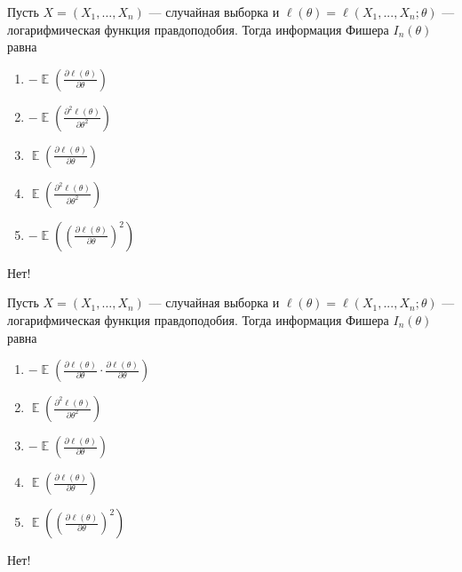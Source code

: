 \documentclass[t]{beamer}
\DeclareMathOperator{\E}{\mathbb{E}}
\begin{document}
 \begin{frame} \label{50-No} 
\begin{block}{50} 

Пусть $X = (X_1, \ldots , X_n)$ — случайная выборка и $\ell(\theta) = \ell(X_1, ... , X_n; \theta)$ — логарифмическая функция правдоподобия. Тогда информация Фишера $I_n(\theta)$ равна
  


 \end{block} 
\begin{enumerate} 
\item[] \hyperlink{50-No}{\beamergotobutton{} $-\E \left( \frac{\partial \ell (\theta)}{\partial \theta} \right)$}
\item[] \hyperlink{50-Yes}{\beamergotobutton{} $-\E \left( \frac{\partial^2 \ell (\theta)}{\partial \theta^2} \right)$}
\item[] \hyperlink{50-No}{\beamergotobutton{} $\E \left( \frac{\partial \ell (\theta)}{\partial \theta} \right)$}
\item[] \hyperlink{50-No}{\beamergotobutton{} $\E \left( \frac{\partial^2 \ell (\theta)}{\partial \theta^2} \right)$}
\item[] \hyperlink{50-No}{\beamergotobutton{} $-\E \left( \left( \frac{\partial \ell (\theta)}{\partial \theta} \right) ^2 \right)$}
\end{enumerate} 

 \alert{Нет!} 
\end{frame} 


 \begin{frame} \label{51-No} 
\begin{block}{51} 

Пусть $X = (X_1, \ldots , X_n)$ — случайная выборка и $\ell(\theta) = \ell(X_1, ... , X_n; \theta)$ — логарифмическая функция правдоподобия. Тогда информация Фишера $I_n(\theta)$ равна
  


 \end{block} 
\begin{enumerate} 
\item[] \hyperlink{51-No}{\beamergotobutton{} $- \E \left( \frac{\partial \ell (\theta)}{\partial \theta} \cdot \frac{\partial \ell (\theta)}{\partial \theta} \right)$}
\item[] \hyperlink{51-No}{\beamergotobutton{} $ \E \left( \frac{\partial^2 \ell (\theta)}{\partial \theta^2} \right)$}
\item[] \hyperlink{51-No}{\beamergotobutton{} $- \E \left( \frac{\partial \ell (\theta)}{\partial \theta} \right)$}
\item[] \hyperlink{51-No}{\beamergotobutton{} $\E \left( \frac{\partial \ell (\theta)}{\partial \theta} \right)$}
\item[] \hyperlink{51-Yes}{\beamergotobutton{} $\E \left( \left( \frac{\partial \ell (\theta)}{\partial \theta} \right) ^2 \right)$}
\end{enumerate} 

 \alert{Нет!} 
\end{frame} 
\end{document}
